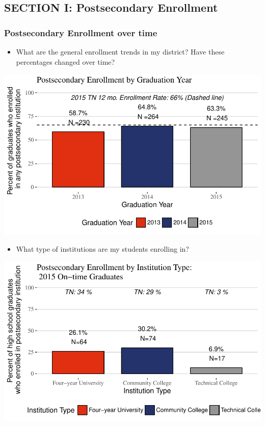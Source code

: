 \documentclass[11pt,]{article}
\providecommand{\tightlist}{%
  \setlength{\itemsep}{0pt}\setlength{\parskip}{0pt}}
\begin{document}
\newpage

\subsection{SECTION I: Postsecondary
Enrollment}\label{section-i-postsecondary-enrollment}

\subsubsection{Postsecondary Enrollment over
time}\label{postsecondary-enrollment-over-time}

\begin{itemize}
\tightlist
\item
  What are the general enrollment trends in my district? Have these
  percentages changed over time?
\end{itemize}

\begin{center}\includegraphics{20170419_PSWRR_files/figure-latex/Enrollment over time-1} \end{center}

\begin{itemize}
\tightlist
\item
  What type of institutions are my students enrolling in?
\end{itemize}

\begin{center}\includegraphics{20170419_PSWRR_files/figure-latex/District by Type-1} \end{center}
\end{document}
